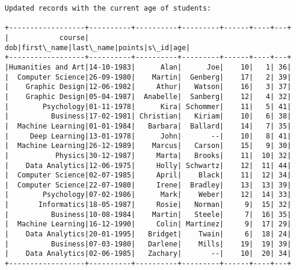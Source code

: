 \documentclass[11pt]{article}
\begin{document}
    \begin{Verbatim}[commandchars=\\\{\}]
Updated records with the current age of students: 

+------------------+----------+----------+---------+------+----+---+
|            course|       dob|first\_name|last\_name|points|s\_id|age|
+------------------+----------+----------+---------+------+----+---+
|Humanities and Art|14-10-1983|      Alan|      Joe|    10|   1| 36|
|  Computer Science|26-09-1980|    Martin|  Genberg|    17|   2| 39|
|    Graphic Design|12-06-1982|     Athur|   Watson|    16|   3| 37|
|    Graphic Design|05-04-1987|  Anabelle|  Sanberg|    12|   4| 32|
|        Psychology|01-11-1978|      Kira| Schommer|    11|   5| 41|
|          Business|17-02-1981| Christian|   Kiriam|    10|   6| 38|
|  Machine Learning|01-01-1984|   Barbara|  Ballard|    14|   7| 35|
|     Deep Learning|13-01-1978|      John|       --|    10|   8| 41|
|  Machine Learning|26-12-1989|    Marcus|   Carson|    15|   9| 30|
|           Physics|30-12-1987|     Marta|   Brooks|    11|  10| 32|
|    Data Analytics|12-06-1975|     Holly| Schwartz|    12|  11| 44|
|  Computer Science|02-07-1985|     April|    Black|    11|  12| 34|
|  Computer Science|22-07-1980|     Irene|  Bradley|    13|  13| 39|
|        Psychology|07-02-1986|      Mark|    Weber|    12|  14| 33|
|       Informatics|18-05-1987|     Rosie|   Norman|     9|  15| 32|
|          Business|10-08-1984|    Martin|   Steele|     7|  16| 35|
|  Machine Learning|16-12-1990|     Colin| Martinez|     9|  17| 29|
|    Data Analytics|20-01-1995|   Bridget|    Twain|     6|  18| 24|
|          Business|07-03-1980|   Darlene|    Mills|    19|  19| 39|
|    Data Analytics|02-06-1985|   Zachary|       --|    10|  20| 34|
+------------------+----------+----------+---------+------+----+---+


    \end{Verbatim}
\end{document}
